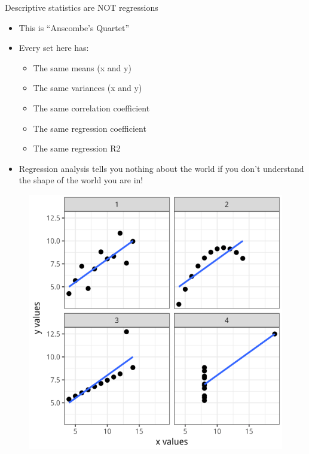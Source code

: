 \documentclass[aspectratio=169]{beamer}
\begin{document}
\begin{frame}[fragile]{Descriptive statistics are NOT regressions}
\begin{multicols}{2}	
	\begin{itemize}
		\item This is “Anscombe’s Quartet”
		\item Every set here has: 
			\begin{itemize}
				\item The same means (x and y)
				\item The same variances (x and y)
				\item The same correlation coefficient
				\item The same regression coefficient
				\item The same regression R2 
			\end{itemize}
		\item Regression analysis tells you nothing about the world if you don’t understand the shape of the world you are in!
	\end{itemize}
	\begin{figure}
		\centering
		\includegraphics[width=\linewidth]{img/graphpanel1}
	\end{figure}
\end{multicols}
\end{frame}
\end{document}
